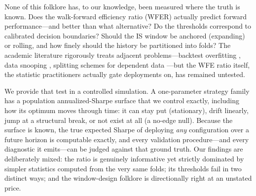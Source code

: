 \documentclass[11pt]{article}
\begin{document}
None of this folklore has, to our knowledge, been measured where the truth is
known. Does the walk-forward efficiency ratio (WFER) actually predict forward
performance---and better than what alternative? Do the thresholds correspond
to calibrated decision boundaries? Should the IS window be anchored
(expanding) or rolling, and how finely should the history be partitioned into
folds? The academic literature rigorously treats adjacent problems---backtest
overfitting \citep{bailey2014pseudomathematics,bailey2017probability},
data snooping \citep{white2000reality}, splitting schemes for dependent data
\citep{bergmeir2012use,lopezdeprado2018advances}---but the WFE ratio itself,
the statistic practitioners actually gate deployments on, has remained
untested.

We provide that test in a controlled simulation. A one-parameter strategy
family has a population annualized-Sharpe surface that we control exactly,
including how its optimum moves through time: it can stay put (stationary),
drift linearly, jump at a structural break, or not exist at all (a no-edge
null). Because the surface is known, the true expected Sharpe of deploying
\emph{any} configuration over a future horizon is computable exactly, and
every validation procedure---and every diagnostic it emits---can be judged
against that ground truth. Our findings are deliberately mixed: the ratio is
genuinely informative yet strictly dominated by simpler statistics computed
from the very same folds; its thresholds fail in two distinct ways; and the
window-design folklore is directionally right at an unstated price.
\end{document}
